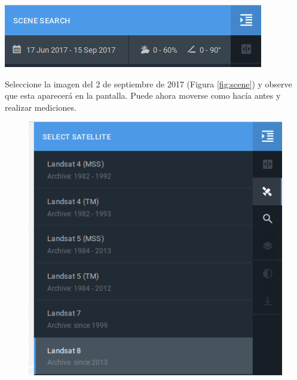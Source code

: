 \documentclass[a4paper,12pt]{book}
\begin{document}
\begin{center}\includegraphics[scale=0.4]{in:nubes.png}\end{center}

Seleccione la imagen del 2 de septiembre de 2017 (Figura \ref{fig:scene}) y observe que esta aparecerá en la pantalla. Puede ahora moverse como hacía antes y realizar mediciones.

\begin{figure}[h!]
\centering
\begin{minipage}{.425\linewidth}
  \includegraphics[width=\linewidth]{fig:sat.png}
\end{minipage}
\hspace{.05\linewidth}
\begin{minipage}{.425\linewidth}

\end{minipage}
\end{figure}
\end{document}
